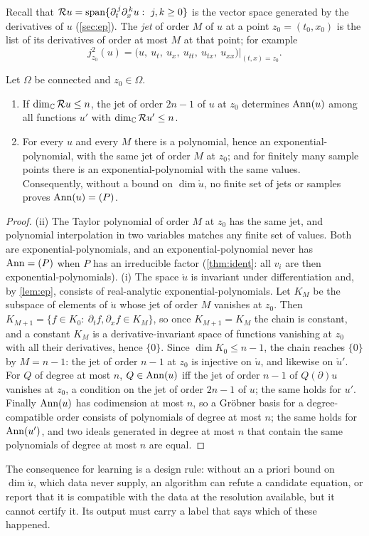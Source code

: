 Recall that $\mathcal{R} u=\operatorname{span}\{\partial_t^{\,j}\partial_x^{\,k}u:\ j,k\ge0\}$ is the vector space generated by the
derivatives of $u$ (\cref{sec:ep}). The \emph{jet} of order $M$ of $u$ at a point $z_0=(t_0,x_0)$ is the list of its
derivatives of order at most $M$ at that point; for example
\[
  j^2_{z_0}(u)=\big(u,\ u_t,\ u_x,\ u_{tt},\ u_{tx},\ u_{xx}\big)\big|_{(t,x)=z_0}.
\]

\begin{proposition}\label{prop:certify}\label{thm:nocert}\label{thm:blackbox}
Let $\Omega$ be connected and $z_0\in\Omega$.
\begin{enumerate}[label=(\roman*)]
  \item If $\dim_{\mathbb{C}}\mathcal{R} u\le n$, the jet of order $2n-1$ of $u$ at $z_0$ determines $\operatorname{Ann}(u)$ among all functions
  $u'$ with $\dim_{\mathbb{C}}\mathcal{R} u'\le n$.
  \item For every $u$ and every $M$ there is a polynomial, hence an exponential-polynomial, with the same jet of
  order $M$ at $z_0$; and for finitely many sample points there is an exponential-polynomial with the same values.
  Consequently, without a bound on $\dim\ring u$, no finite set of jets or samples proves $\operatorname{Ann}(u)=(P)$.
\end{enumerate}
\end{proposition}

\begin{proof}
(ii) The Taylor polynomial of order $M$ at $z_0$ has the same jet, and polynomial interpolation in two variables
matches any finite set of values. Both are exponential-polynomials, and an exponential-polynomial never has
$\operatorname{Ann}=(P)$ when $P$ has an irreducible factor (\cref{thm:ident}: all $v_i$ are then exponential-polynomials).
(i) The space $\ring u$ is invariant under differentiation and, by \cref{lem:ep}, consists of real-analytic
exponential-polynomials. Let $K_M$ be the subspace of elements of $\ring u$ whose jet of order $M$ vanishes at $z_0$.
Then $K_{M+1}=\{f\in K_0:\ \partial_tf,\partial_xf\in K_M\}$, so once $K_{M+1}=K_M$ the chain is constant, and a
constant $K_M$ is a derivative-invariant space of functions vanishing at $z_0$ with all their derivatives, hence
$\{0\}$. Since $\dim K_0\le n-1$, the chain reaches $\{0\}$ by $M=n-1$: the jet of order $n-1$ at $z_0$ is injective
on $\ring u$, and likewise on $\ring u'$. For $Q$ of degree at most $n$, $Q\in\operatorname{Ann}(u)$ iff the jet of order
$n-1$ of $Q(\partial)u$ vanishes at $z_0$, a condition on the jet of order $2n-1$ of $u$; the same holds for $u'$.
Finally $\operatorname{Ann}(u)$ has codimension at most $n$, so a Gr\"obner basis for a degree-compatible order consists of
polynomials of degree at most $n$; the same holds for $\operatorname{Ann}(u')$, and two ideals generated in degree at most $n$
that contain the same polynomials of degree at most $n$ are equal.
\end{proof}

The consequence for learning is a design rule: without an a priori bound on $\dim\ring u$, which data never
supply, an algorithm can refute a candidate equation, or report that it is compatible with the data at
the resolution available, but it cannot certify it. Its output must carry a label that says which of these
happened.
